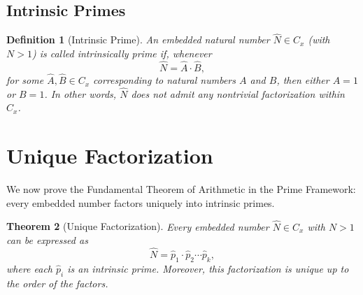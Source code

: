 \documentclass{article}
\newtheorem{theorem}{Theorem}[section]
\newtheorem{definition}[theorem]{Definition}
\begin{document}
\subsection{Intrinsic Primes}
\begin{definition}[Intrinsic Prime]
  An embedded natural number \(\widehat{N}\in C_x\) (with \(N>1\)) is called \emph{intrinsically prime} if, whenever 
  \[
    \widehat{N} = \widehat{A}\cdot\widehat{B},
  \]
  for some \(\widehat{A},\widehat{B}\in C_x\) corresponding to natural numbers \(A\) and \(B\), then either \(A=1\) or \(B=1\). In other words, \(\widehat{N}\) does not admit any nontrivial factorization within \(C_x\).
\end{definition}

\section{Unique Factorization}
We now prove the Fundamental Theorem of Arithmetic in the Prime Framework: every embedded number factors uniquely into intrinsic primes.

\begin{theorem}[Unique Factorization]
  Every embedded number \(\widehat{N}\in C_x\) with \(N>1\) can be expressed as
  \[
    \widehat{N} = \widehat{p}_1 \cdot \widehat{p}_2 \cdots \widehat{p}_k,
  \]
  where each \(\widehat{p}_i\) is an intrinsic prime. Moreover, this factorization is unique up to the order of the factors.
\end{theorem}
\end{document}
